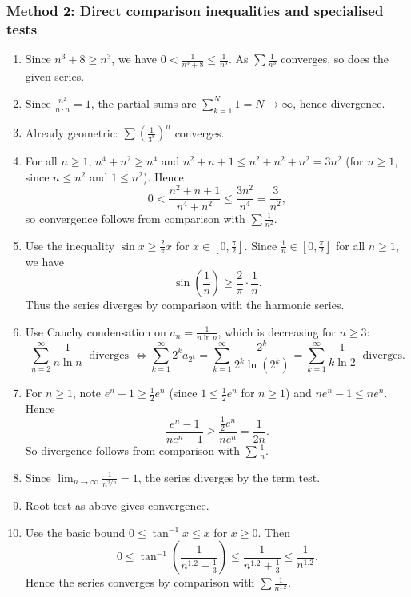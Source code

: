 \documentclass[12pt]{article}
\begin{document}
\subsubsection*{Method 2: Direct comparison inequalities and specialised tests}
\begin{enumerate}[label=(\alph*)]
\item Since \(n^3+8\ge n^3\), we have \(0<\frac{1}{n^3+8}\le \frac{1}{n^3}\). As \(\sum\frac{1}{n^3}\) converges, so does the given series.

\item Since \(\frac{n^2}{n\cdot n}=1\), the partial sums are \(\sum_{k=1}^N 1=N\to\infty\), hence divergence.

\item Already geometric:
\(\sum \left(\frac{1}{3^8}\right)^n\) converges.

\item For all \(n\ge 1\), \(n^4+n^2\ge n^4\) and \(n^2+n+1\le n^2+n^2+n^2=3n^2\) (for \(n\ge 1\), since \(n\le n^2\) and \(1\le n^2\)).
Hence
\[
0<\frac{n^2+n+1}{n^4+n^2}\le \frac{3n^2}{n^4}=\frac{3}{n^2},
\]
so convergence follows from comparison with \(\sum \frac{1}{n^2}\).

\item Use the inequality \(\sin x \ge \frac{2}{\pi}x\) for \(x\in[0,\frac{\pi}{2}]\).
Since \(\frac{1}{n}\in\left[0,\frac{\pi}{2}\right]\) for all \(n\ge 1\), we have
\[
\sin\!\left(\frac{1}{n}\right)\ge \frac{2}{\pi}\cdot\frac{1}{n}.
\]
Thus the series diverges by comparison with the harmonic series.

\item Use Cauchy condensation on \(a_n=\frac{1}{n\ln n}\), which is decreasing for \(n\ge 3\):
\[
\sum_{n=2}^{\infty}\frac{1}{n\ln n}\ \text{ diverges }
\Longleftrightarrow
\sum_{k=1}^{\infty} 2^k a_{2^k}=\sum_{k=1}^\infty \frac{2^k}{2^k\ln(2^k)}=\sum_{k=1}^\infty \frac{1}{k\ln 2}
\ \text{ diverges.}
\]

\item For \(n\ge 1\), note \(e^n-1\ge \frac12 e^n\) (since \(1\le \frac12 e^n\) for \(n\ge 1\)) and \(n e^n-1\le n e^n\). Hence
\[
\frac{e^n-1}{n e^n-1}\ge \frac{\frac12 e^n}{n e^n}=\frac{1}{2n}.
\]
So divergence follows from comparison with \(\sum \frac{1}{n}\).

\item Since \(\lim_{n\to\infty}\frac{1}{n^{2/n}}=1\), the series diverges by the term test.

\item Root test as above gives convergence.

\item Use the basic bound \(0\le \tan^{-1}x\le x\) for \(x\ge 0\). Then
\[
0\le \tan^{-1}\!\left(\frac{1}{n^{1.2}+\tfrac13}\right)
\le \frac{1}{n^{1.2}+\tfrac13}
\le \frac{1}{n^{1.2}}.
\]
Hence the series converges by comparison with \(\sum \frac{1}{n^{1.2}}\).
\end{enumerate}
\end{document}
